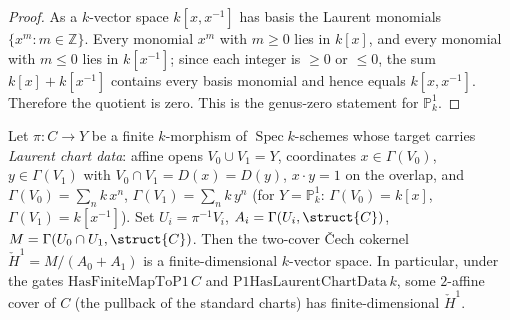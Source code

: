 \begin{proof}
  As a \(k\)-vector space \(k[x, x^{-1}]\) has basis the Laurent
  monomials \(\{x^m : m \in \mathbb{Z}\}\). Every monomial \(x^m\) with
  \(m \ge 0\) lies in \(k[x]\), and every monomial with \(m \le 0\) lies
  in \(k[x^{-1}]\); since each integer is \(\ge 0\) or \(\le 0\), the sum
  \(k[x] + k[x^{-1}]\) contains every basis monomial and hence equals
  \(k[x, x^{-1}]\). Therefore the quotient is zero. This is the genus-zero
  statement for \(\mathbb{P}^1_k\).
\end{proof}

\begin{theorem}
  \label{thm:adelic_finiteDimensional_cokernel_zero}
  \leanok
  Let \(\pi \colon C \to Y\) be a finite \(k\)-morphism of
  \(\operatorname{Spec} k\)-schemes whose target carries \emph{Laurent
  chart data}: affine opens \(V_0 \cup V_1 = Y\), coordinates
  \(x \in \Gamma(V_0)\), \(y \in \Gamma(V_1)\) with
  \(V_0 \cap V_1 = D(x) = D(y)\), \(x \cdot y = 1\) on the overlap, and
  \(\Gamma(V_0) = \sum_n k\, x^n\), \(\Gamma(V_1) = \sum_n k\, y^n\) (for
  \(Y = \mathbb{P}^1_k\): \(\Gamma(V_0) = k[x]\),
  \(\Gamma(V_1) = k[x^{-1}]\)). Set \(U_i = \pi^{-1} V_i\),
  \(A_i = \Gamma(U_i, \struct{C})\),
  \(M = \Gamma(U_0 \cap U_1, \struct{C})\). Then the two-cover Čech
  cokernel \(\check{H}^1 = M/(A_0 + A_1)\) is a finite-dimensional
  \(k\)-vector space. In particular, under the gates
  \(\mathrm{HasFiniteMapToP1}\, C\) and \(\mathrm{P1HasLaurentChartData}\,
  k\), some \(2\)-affine cover of \(C\) (the pullback of the standard
  charts) has finite-dimensional \(\check{H}^1\).
\end{theorem}
